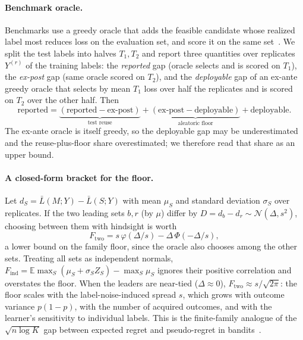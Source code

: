 \documentclass[runningheads]{llncs}
\begin{document}
\paragraph{Benchmark oracle.} Benchmarks use a greedy oracle that adds the feasible candidate whose realized label most reduces loss on the evaluation set, and score it on the same set~\cite{werner2023comparable,werner2024cdalbench}. We split the test labels into halves $T_1,T_2$ and report three quantities over replicates $Y^{(r)}$ of the training labels: the \emph{reported} gap (oracle selects and is scored on $T_1$), the \emph{ex-post} gap (same oracle scored on $T_2$), and the \emph{deployable} gap of an ex-ante greedy oracle that selects by mean $T_1$ loss over half the replicates and is scored on $T_2$ over the other half. Then
\[
\text{reported}=\underbrace{(\text{reported}-\text{ex-post})}_{\text{test reuse}}+\underbrace{(\text{ex-post}-\text{deployable})}_{\text{aleatoric floor}}+\text{deployable}.
\]
The ex-ante oracle is itself greedy, so the deployable gap may be underestimated and the reuse-plus-floor share overestimated; we therefore read that share as an upper bound.

\paragraph{A closed-form bracket for the floor.} Let $d_S=\bar L(M;Y)-\bar L(S;Y)$ with mean $\mu_S$ and standard deviation $\sigma_S$ over replicates. If the two leading sets $b,r$ (by $\mu$) differ by $D=d_b-d_r\sim\mathcal N(\Delta,s^2)$, choosing between them with hindsight is worth
\begin{equation}
 F_{\mathrm{two}}=s\,\varphi(\Delta/s)-\Delta\,\Phi(-\Delta/s),\label{eq:two}
\end{equation}
a lower bound on the family floor, since the oracle also chooses among the other sets. Treating all sets as independent normals, $F_{\mathrm{ind}}=\mathbb E\max_S(\mu_S+\sigma_SZ_S)-\max_S\mu_S$ ignores their positive correlation and overstates the floor. When the leaders are near-tied ($\Delta\approx0$), $F_{\mathrm{two}}\approx s/\sqrt{2\pi}$: the floor scales with the label-noise-induced spread $s$, which grows with outcome variance $p(1-p)$, with the number of acquired outcomes, and with the learner's sensitivity to individual labels. This is the finite-family analogue of the $\sqrt{n\log K}$ gap between expected regret and pseudo-regret in bandits~\cite{audibert2010regret}.
\end{document}
